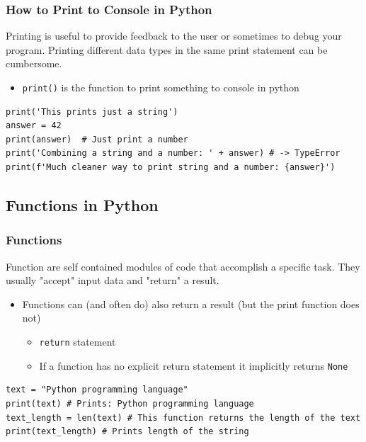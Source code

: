 \documentclass[10pt, a4paper]{beamer} %
\begin{document}
\begin{frame}[c, fragile]\frametitle{How to Print to Console in Python}
  Printing is useful to provide feedback to the user or sometimes to debug your program. Printing different data types
  in the same print statement can be cumbersome.
  \begin{itemize}
    \item \texttt{print()} is the function to print something to console in python
  \end{itemize}

  \begin{lstlisting}
print('This prints just a string')
answer = 42
print(answer)  # Just print a number
print('Combining a string and a number: ' + answer) # -> TypeError
print(f'Much cleaner way to print string and a number: {answer}')
\end{lstlisting}


\end{frame}

\subsection{Functions in Python} %
\label{sub:functions}
\begin{frame}
  \frametitle{Functions}
  Function are self contained modules of code that accomplish a specific task. They usually "accept" input data and "return" a result.
  \begin{itemize}
    \begin{lstlisting}
name = "Some name"
print(name) # Some name is used inside the print function -> the print function accepts the input and prints it to the console
    \end{lstlisting}
    \item Functions can (and often do) also return a result (but the print function does not)
          \begin{itemize}
            \item \lstinline!return! statement
            \item If a function has no explicit return statement it implicitly returns \lstinline!None!
          \end{itemize}
  \end{itemize}

  \begin{examples}
    \begin{lstlisting}
text = "Python programming language"
print(text) # Prints: Python programming language
text_length = len(text) # This function returns the length of the text
print(text_length) # Prints length of the string
  \end{lstlisting}
  \end{examples}
\end{frame}
\end{document}
